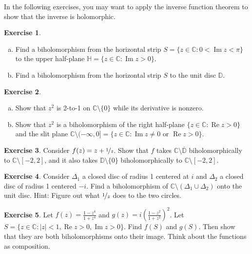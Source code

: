 \documentclass[12pt,openany]{book}
\renewcommand{\Re}{\operatorname{Re}}
\renewcommand{\Im}{\operatorname{Im}}
\newcommand{\sabs}[1]{\lvert {#1} \rvert}
\newcommand{\C}{{\mathbb{C}}}
\newcommand{\D}{{\mathbb{D}}}
\newcommand{\bH}{{\mathbb{H}}}
\theoremstyle{plain}
\theoremstyle{remark}
\theoremstyle{definition}
\newenvironment{exbox}{%
    \def\FrameCommand{\vrule width 1pt \relax\hspace{10pt}}%
    \MakeFramed{\advance\hsize-\width\FrameRestore}%
}{%
    \endMakeFramed
}
\newenvironment{exparts}{%
    \leavevmode\begin{enumerate}[a),noitemsep,topsep=0pt,parsep=0pt,partopsep=0pt]
}{%
    \end{enumerate}
}
\theoremstyle{exercise}
\newtheorem{exercise}{Exercise}[section]
\theoremstyle{example}
\begin{document}
In the following exercises, you may want to apply the inverse
function theorem to show that the inverse is holomorphic.

\begin{exbox}
\begin{exercise}
\begin{exparts}
\item
Find a biholomorphism from the horizontal strip
$S = \{ z \in \C : 0 < \Im z < \pi \}$ to
the upper half-plane $\bH = \{ z \in \C : \Im z > 0 \}$.
\item
Find a biholomorphism from the horizontal strip
$S$ to the unit disc $\D$.
\end{exparts}
\end{exercise}

\begin{exercise}
\pagebreak[2]
\begin{exparts}
\item
Show that $z^2$ is 2-to-1 on $\C \setminus \{ 0 \}$ while its
derivative is nonzero.
\item
Show that $z^2$ is a biholomorphism of the right half-plane
$\{ z \in \C : \Re z > 0 \}$
and the slit plane $\C \setminus (-\infty,0] = \{ z \in \C : \Im z \not= 0 \text{ or } \Re z > 0 \}$.
\end{exparts}
\end{exercise}

\begin{exercise} \label{exercise:segmentcomplement}
Consider $f(z) = z+ \nicefrac{1}{z}$.  Show that $f$ takes $\C \setminus
\overline{\D}$ biholomorphically to $\C \setminus [-2,2]$, and it also takes
$\D \setminus \{ 0 \}$ biholomorphically to $\C \setminus [-2,2]$.
\end{exercise}

\begin{exercise}
Consider $\Delta_1$ a closed disc of radius 1 centered at $i$ and $\Delta_2$ a closed disc of radius 1 centered $-i$.
Find a biholomorphism of $\C \setminus (\Delta_1 \cup \Delta_2)$
onto the unit disc.
Hint: Figure out what $\nicefrac{1}{z}$ does to the two circles.
\end{exercise}

\begin{exercise}
Let $f(z) = \frac{1-z^4}{1+z^4}$ and $g(z) = i {\left( \frac{1-z^2}{1+z^2}
\right)}^2$.  Let $S = \{ z \in \C : \sabs{z} < 1, \Re z > 0, \Im z > 0 \}$.
Find $f(S)$ and $g(S)$.  Then show that they are both biholomorphisms onto their
image.  Think about the functions as composition.
\end{exercise}


\end{exbox}
\end{document}
